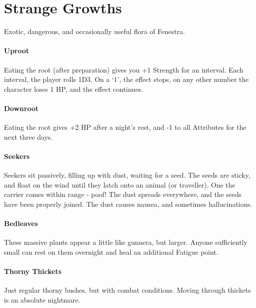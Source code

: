 \chapter{Strange Growths}

\begin{multicols}{2}

Exotic, dangerous, and occasionally useful flora of Fenestra.

\subsubsection{Uproot}

Eating the root (after preparation) gives you +1 Strength for an interval.
Each interval, the player rolls 1D3.
On a `1', the effect stops, on any other number the character loses 1 HP, and the effect continues.

\subsubsection{Downroot}

Eating the root gives +2 HP after a night's rest, and -1 to all Attributes for the next three days.

\subsubsection{Seekers}

Seekers sit passively, filling up with dust, waiting for a seed.
The seeds are sticky, and float on the wind until they latch onto an animal (or traveller).
One the carrier comes within range - poof!
The dust spreads everywhere, and the seeds have been properly joined.
The dust causes nausea, and sometimes hallucinations.

\subsubsection{Bedleaves}

These massive plants appear a little like gunnera, but larger.
Anyone sufficiently small can rest on them overnight and heal an additional Fatigue point.

\subsubsection{Thorny Thickets}

Just regular thorny bushes, but with combat conditions.
Moving through thickets is an absolute nightmare.


\end{multicols}
